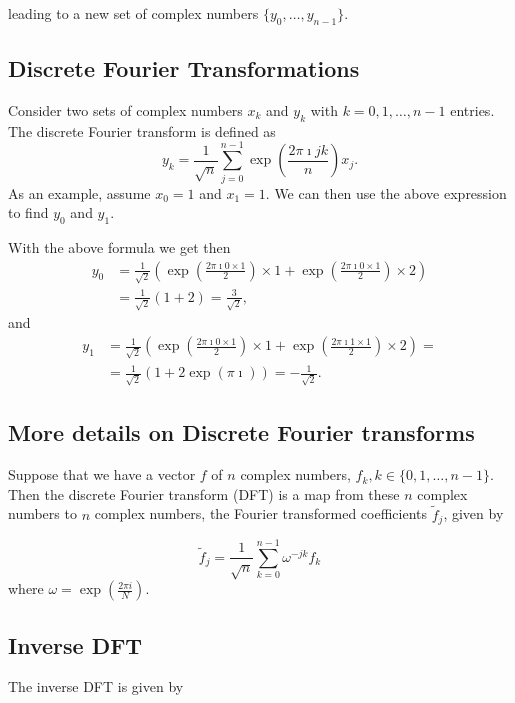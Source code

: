 \documentclass[%
oneside,                 %
final,                   %
10pt]{article}
\begin{document}
leading to a new set of complex numbers $\{ y_0,\dots,y_{n-1}\}$. 

\subsection{Discrete Fourier Transformations}

Consider two sets of complex numbers $x_k$ and $y_k$ with
$k=0,1,\dots,n-1$ entries. The discrete Fourier transform is defined
as
\[
y_k = \frac{1}{\sqrt{n}} \sum_{j=0}^{n-1} \exp{(\frac{2\pi\imath jk}{n})} x_j.
\]
As an example, assume $x_0=1$ and $x_1=1$. We can then use the above expression to find $y_0$ and $y_1$.

With the above formula we get then
\begin{align*}
y_0 &= \frac{1}{\sqrt{2}} \left( \exp{(\frac{2\pi\imath 0\times 1}{2})} \times 1+\exp{(\frac{2\pi\imath 0\times 1}{2})}\times 2\right)\\
& =\frac{1}{\sqrt{2}}(1+2)=\frac{3}{\sqrt{2}},
\end{align*}
and
\begin{align*}
y_1 &= \frac{1}{\sqrt{2}} \left( \exp{(\frac{2\pi\imath 0\times 1}{2})} \times 1+\exp{(\frac{2\pi\imath 1\times 1}{2})}\times 2\right)=\\
& =\frac{1}{\sqrt{2}}(1+2\exp{(\pi\imath)})=-\frac{1}{\sqrt{2}}.
\end{align*}

\subsection{More details on Discrete Fourier transforms}

Suppose that we have a vector $f$ of $n$ complex numbers, $f_{k}, k
\in\{0,1, \ldots, n-1\}$. Then the discrete Fourier transform (DFT) is
a map from these $n$ complex numbers to $n$ complex numbers, the
Fourier transformed coefficients $\tilde{f}_{j}$, given by

\begin{equation*}
\tilde{f}_{j}=\frac{1}{\sqrt{n}} \sum_{k=0}^{n-1} \omega^{-j k} f_{k}
\end{equation*}
where $\omega=\exp \left(\frac{2 \pi i}{N}\right)$.

\subsection{Inverse DFT}

The inverse DFT is given by
\end{document}
